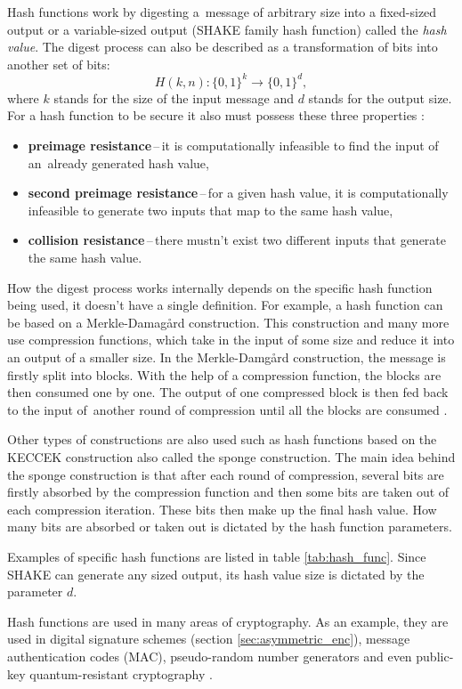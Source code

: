 Hash functions work by digesting a~message of arbitrary size into a fixed-sized output or a variable-sized output (SHAKE family hash function) called the \textit{hash value}. The digest process can also be described as a transformation of bits into another set of bits:
\begin{equation}
  H(k, n): \{0,1\}^k \rightarrow \{0,1\}^d,
\end{equation}
where $k$ stands for the size of the input message and $d$ stands for the output size.
\newpage
\noindent For a hash function to be secure it also must possess these three properties \cite{Paar2010}:
\begin{itemize}
  \item \textbf{preimage resistance}\,--\,it is computationally infeasible to find the input of an~already generated hash value,
  \item \textbf{second preimage resistance}\,--\,for a given hash value, it is computationally infeasible to generate two inputs that map to the same hash value,
  \item \textbf{collision resistance}\,--\,there mustn't exist two different inputs that generate the same hash value.
\end{itemize}

How the digest process works internally depends on the specific hash function being used, it doesn't have a single definition. For example, a hash function can be based on a Merkle-Damag\aa rd construction. This construction and many more use compression functions, which take in the input of some size and reduce it into an output of a smaller size. In the Merkle-Damg\aa rd construction, the message is firstly split into blocks. With the help of a compression function, the blocks are then consumed one by one. The output of one compressed block is then fed back to the input of~another round of compression until all the blocks are consumed \cite{Smart2004}.

Other types of constructions are also used such as hash functions based on the KECCEK construction also called the sponge construction. The main idea behind the sponge construction is that after each round of compression, several bits are firstly absorbed by the compression function and then some bits are taken out of each compression iteration. These bits then make up the final hash value. How many bits are absorbed or taken out is dictated by the hash function parameters. \cite{1Od8f4TuMxetfmHu}

Examples of specific hash functions are listed in table \ref{tab:hash_func}. Since SHAKE can generate any sized output, its hash value size is dictated by the parameter $d$.


Hash functions are used in many areas of cryptography. As an example, they are used in digital signature schemes (section \ref{sec:asymmetric_enc}), message authentication codes (\acs{MAC}), pseudo-random number generators and even public-key quantum-resistant cryptography \cite{Chen2016}.

